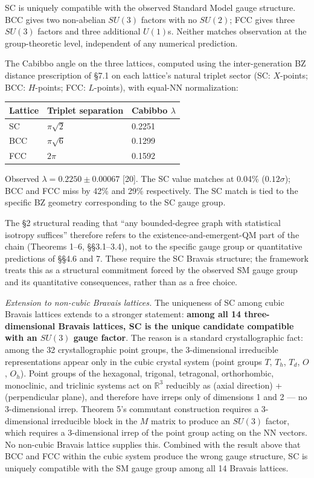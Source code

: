 \documentclass[
]{article}
\begin{document}
SC is uniquely compatible with the observed Standard Model gauge
structure. BCC gives two non-abelian \(SU(3)\) factors with no
\(SU(2)\); FCC gives three \(SU(3)\) factors and three additional
\(U(1)\)s. Neither matches observation at the group-theoretic level,
independent of any numerical prediction.

The Cabibbo angle on the three lattices, computed using the
inter-generation BZ distance prescription of §7.1 on each lattice's
natural triplet sector (SC: \(X\)-points; BCC: \(H\)-points; FCC:
\(L\)-points), with equal-NN normalization:

\begin{longtable}[]{@{}lll@{}}
\toprule\noalign{}
Lattice & Triplet separation & Cabibbo \(\lambda\) \\
\midrule\noalign{}
\endhead
\bottomrule\noalign{}
\endlastfoot
SC & \(\pi\sqrt{2}\) & 0.2251 \\
BCC & \(\pi\sqrt{6}\) & 0.1299 \\
FCC & \(2\pi\) & 0.1592 \\
\end{longtable}

Observed \(\lambda = 0.2250 \pm 0.00067\) {[}20{]}. The SC value matches
at 0.04\% (\(0.12\sigma\)); BCC and FCC miss by 42\% and 29\%
respectively. The SC match is tied to the specific BZ geometry
corresponding to the SC gauge group.

The §2 structural reading that ``any bounded-degree graph with
statistical isotropy suffices'' therefore refers to the
existence-and-emergent-QM part of the chain (Theorems 1--6, §§3.1--3.4),
not to the specific gauge group or quantitative predictions of §§4.6 and
7. These require the SC Bravais structure; the framework treats this as
a structural commitment forced by the observed SM gauge group and its
quantitative consequences, rather than as a free choice.

\emph{Extension to non-cubic Bravais lattices.} The uniqueness of SC
among cubic Bravais lattices extends to a stronger statement:
\textbf{among all 14 three-dimensional Bravais lattices, SC is the
unique candidate compatible with an \(SU(3)\) gauge factor}. The reason
is a standard crystallographic fact: among the 32 crystallographic point
groups, the 3-dimensional irreducible representations appear only in the
cubic crystal system (point groups \(T\), \(T_h\), \(T_d\), \(O\),
\(O_h\)). Point groups of the hexagonal, trigonal, tetragonal,
orthorhombic, monoclinic, and triclinic systems act on \(\mathbb{R}^3\)
reducibly as (axial direction) + (perpendicular plane), and therefore
have irreps only of dimensions 1 and 2 --- no 3-dimensional irrep.
Theorem 5's commutant construction requires a 3-dimensional irreducible
block in the \(M\) matrix to produce an \(SU(3)\) factor, which requires
a 3-dimensional irrep of the point group acting on the NN vectors. No
non-cubic Bravais lattice supplies this. Combined with the result above
that BCC and FCC within the cubic system produce the wrong gauge
structure, SC is uniquely compatible with the SM gauge group among all
14 Bravais lattices.
\end{document}
